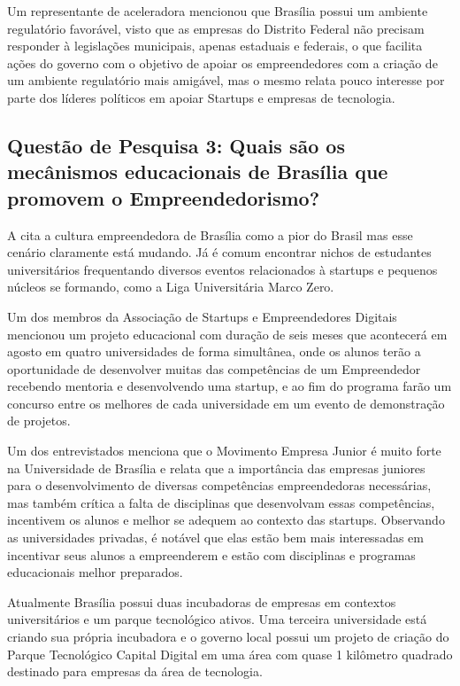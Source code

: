 Um representante de aceleradora mencionou que Brasília possui um ambiente regulatório favorável, visto que as empresas do Distrito Federal não precisam responder à legislações municipais, apenas estaduais e federais, o que facilita ações do governo com o objetivo de apoiar os empreendedores com a criação de um ambiente regulatório mais amigável, mas o mesmo relata pouco interesse por parte dos líderes políticos em apoiar Startups e empresas de tecnologia.
  
\subsection{Questão de Pesquisa 3: Quais são os mecânismos educacionais de Brasília que promovem o Empreendedorismo?}
\label{subsection:pergunta_de_pesquisa_3}

A  cita a cultura empreendedora de Brasília como a pior do Brasil mas esse cenário claramente está mudando. Já é comum encontrar nichos de estudantes universitários frequentando diversos eventos relacionados à startups e pequenos núcleos se formando, como a Liga Universitária Marco Zero. 

Um dos membros da Associação de Startups e Empreendedores Digitais mencionou um projeto educacional com duração de seis meses que acontecerá em agosto em quatro universidades de forma simultânea, onde os alunos terão a oportunidade de desenvolver muitas das competências de um Empreendedor recebendo mentoria e desenvolvendo uma startup, e ao fim do programa farão um concurso entre os melhores de cada universidade em um evento de demonstração de projetos.

Um dos entrevistados menciona que o Movimento Empresa Junior é muito forte na Universidade de Brasília e relata que a importância das empresas juniores para o desenvolvimento de diversas competências empreendedoras necessárias, mas também crítica a falta de disciplinas que desenvolvam essas competências, incentivem os alunos e melhor se adequem ao contexto das startups. Observando as universidades privadas, é notável que elas estão bem mais interessadas em incentivar seus alunos a empreenderem e estão com disciplinas e programas educacionais melhor preparados.

Atualmente Brasília possui duas incubadoras de empresas em contextos universitários e um parque tecnológico ativos. Uma terceira universidade está criando sua própria incubadora e o governo local possui um projeto de criação do Parque Tecnológico Capital Digital em uma área com quase 1 kilômetro quadrado destinado para empresas da área de tecnologia.

